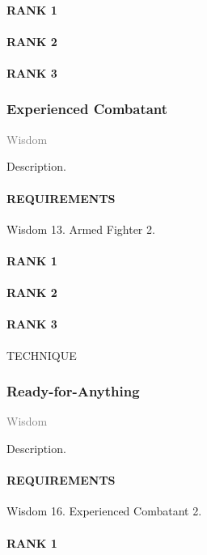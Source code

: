 \paragraph{RANK 1} %
\paragraph{RANK 2}
\paragraph{RANK 3}

\subsubsection{Experienced Combatant} \label{feat::experiencedcombatant} %
\small{\textcolor{gray}{Wisdom}}

\normalsize
Description.
\paragraph{REQUIREMENTS} Wisdom 13. Armed Fighter 2.
\paragraph{RANK 1}
\paragraph{RANK 2}
\paragraph{RANK 3} TECHNIQUE

\subsubsection{Ready-for-Anything} \label{feat::readyforanything} %
\small{\textcolor{gray}{Wisdom}}

\normalsize
Description.
\paragraph{REQUIREMENTS} Wisdom 16. Experienced Combatant 2.
\paragraph{RANK 1}

